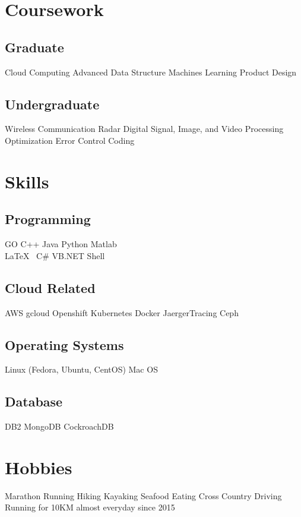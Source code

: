 \documentclass[]{deedy-resume-openfont}
\begin{document}
\begin{minipage}[t]{0.33\textwidth}
\sectionsep


\section{Coursework}
\subsection{Graduate}
Cloud Computing \textbullet Advanced Data Structure \textbullet
Machines Learning \textbullet
Product Design
\sectionsep

\subsection{Undergraduate}
Wireless Communication \textbullet Radar \textbullet Digital Signal, Image, and Video Processing \textbullet Optimization \textbullet Error Control Coding
\sectionsep


\section{Skills}
\subsection{Programming}
GO \textbullet{} C++ \textbullet{} Java \textbullet{} Python \textbullet{} Matlab \\
\LaTeX\ \textbullet{} C\# \textbullet{} VB.NET \textbullet{} Shell \\ 
\subsection{Cloud Related}
AWS \textbullet{} gcloud \textbullet{} Openshift \textbullet{} Kubernetes \textbullet Docker \textbullet JaergerTracing \textbullet Ceph
\subsection{Operating Systems}
Linux (Fedora, Ubuntu, CentOS) \textbullet Mac OS
\subsection{Database}
DB2 \textbullet MongoDB \textbullet CockroachDB
\sectionsep
\section{Hobbies}
Marathon Running \textbullet Hiking \textbullet Kayaking \textbullet Seafood Eating \textbullet Cross Country Driving \textbullet Running for 10KM almost everyday since 2015
\sectionsep
%
%

\end{minipage} 
\end{document}
